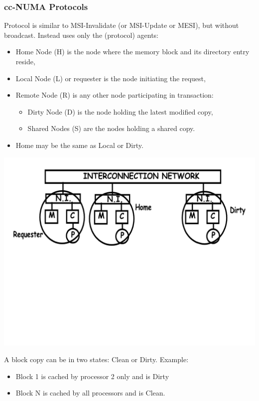 \documentclass{beamer}
\renewcommand{\emph}[1]{\textcolor{structure}{#1}}
\newcommand{\emp}[1]{\textcolor{DikuRed}{ #1}}
\begin{document}
\begin{frame}[fragile,t]
\frametitle{cc-NUMA Protocols}

Protocol is similar to MSI-Invalidate (or MSI-Update or MESI),
but without broadcast.
Instead uses only the (protocol) agents:
\begin{itemize}
    \item \emph{Home Node (H)} is the node where the memory block and its 
            directory entry reside,
    \item \emph{Local Node (L)} or requester is the node initiating the request,
    \item \emp{Remote Node (R)} is any other node participating in transaction:
        \begin{itemize}
            \item \emp{Dirty Node (D)} is the node holding the latest modified copy,
            \item \emp{Shared Nodes (S)} are the nodes holding a shared copy. 
        \end  {itemize}
    \item Home may be the same as Local or Dirty.
\end  {itemize}

\includegraphics[width=55ex]{Figures/FigsInfCoherence/ccNUMA}
\vspace{-1ex}

A block copy can be in two states: Clean or Dirty. Example:
\begin{itemize}
    \item Block 1 is cached by processor 2 only and is Dirty
    \item Block N is cached by all processors and is Clean.
\end  {itemize}

\end{frame}
\end{document}
